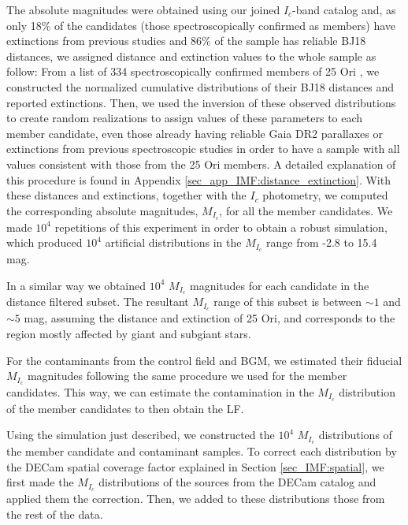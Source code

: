\documentclass[12pt]{article}
\begin{document}
The absolute magnitudes were obtained using our joined $I_c$-band catalog and, as only 18\% of the candidates (those spectroscopically confirmed as members) have extinctions from previous studies and 86\% of the sample has reliable BJ18 distances, we assigned distance and extinction values to the whole sample as follow: From a list of 334 spectroscopically confirmed members of 25 Ori \citep{Briceno2005,Briceno2007,Downes2014,Downes2015,Suarez2017,Briceno2018}, we constructed the normalized cumulative distributions of their BJ18 distances and reported extinctions. Then, we used the inversion of these observed distributions to create random realizations to assign values of these parameters to each member candidate, even those already having reliable Gaia DR2 parallaxes or extinctions from previous spectroscopic studies in order to have a sample with all values consistent with those from the 25 Ori members. A detailed explanation of this procedure is found in Appendix \ref{sec_app_IMF:distance_extinction}. With these distances and extinctions, together with the $I_c$ photometry, we computed the corresponding absolute magnitudes, $M_{I_c}$, for all the member candidates. We made $10^4$ repetitions of this experiment in order to obtain a robust simulation, which produced $10^4$ artificial distributions in the $M_{I_c}$ range from -2.8 to 15.4 mag.

In a similar way we obtained $10^4$ $M_{I_c}$ magnitudes for each candidate in the distance filtered subset. The resultant $M_{I_c}$ range of this subset is between $\sim 1$ and $\sim 5$ mag, assuming the distance and extinction of 25 Ori, and corresponds to the region mostly affected by giant and subgiant stars.

For the contaminants from the control field and BGM, we estimated their fiducial $M_{I_c}$ magnitudes following the same procedure we used for the member candidates. This way, we can estimate the contamination in the $M_{I_c}$ distribution of the member candidates to then obtain the LF.

Using the simulation just described, we constructed the $10^4$ $M_{I_c}$ distributions of the member candidate and contaminant samples. To correct each distribution by the DECam spatial coverage factor explained in Section \ref{sec_IMF:spatial}, we first made the $M_{I_c}$ distributions of the sources from the DECam catalog and applied them the correction. Then, we added to these distributions those from the rest of the data.
\end{document}
